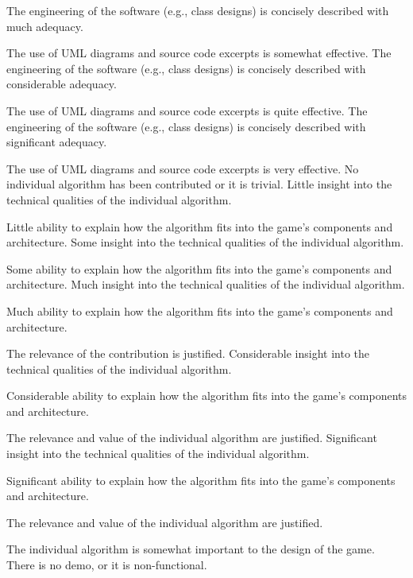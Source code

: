 \documentclass{../fal_assignment}
\begin{document}
\begin{markingrubric}
        \grade The engineering of the software (e.g., class designs) is concisely described with much adequacy.
            \par The use of UML diagrams and source code excerpts is somewhat effective.
        \grade The engineering of the software (e.g., class designs) is concisely described with considerable adequacy.
            \par The use of UML diagrams and source code excerpts is quite effective.
        \grade The engineering of the software (e.g., class designs) is concisely described with significant adequacy.
            \par The use of UML diagrams and source code excerpts is very effective.
%
        \grade\fail No individual algorithm has been contributed or it is trivial.
        \grade Little insight into the technical qualities of the individual algorithm.
            \par Little ability to explain how the algorithm fits into the game's components and architecture.
        \grade Some insight into the technical qualities of the individual algorithm.
            \par Some ability to explain how the algorithm fits into the game's components and architecture.
        \grade Much insight into the technical qualities of the individual algorithm.
            \par Much ability to explain how the algorithm fits into the game's components and architecture.
            \par The relevance of the contribution is justified.
        \grade Considerable insight into the technical qualities of the individual algorithm.
            \par Considerable ability to explain how the algorithm fits into the game's components and architecture.
            \par The relevance and value of the individual algorithm are justified.
        \grade Significant insight into the technical qualities of the individual algorithm.
            \par Significant ability to explain how the algorithm fits into the game's components and architecture.
            \par The relevance and value of the  individual algorithm are justified.
            \par The  individual algorithm is somewhat important to the design of the game.
%
        \grade\fail There is no demo, or it is non-functional.

\end{markingrubric}
\end{document}
